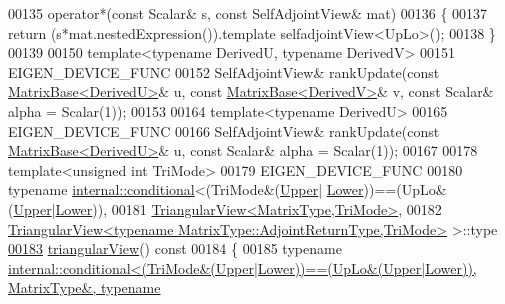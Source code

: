 \begin{DoxyCode}
00135     operator*(\textcolor{keyword}{const} Scalar& s, \textcolor{keyword}{const} SelfAdjointView& mat)
00136     \{
00137       \textcolor{keywordflow}{return} (s*mat.nestedExpression()).\textcolor{keyword}{template} selfadjointView<UpLo>();
00138     \}
00139 
00150     \textcolor{keyword}{template}<\textcolor{keyword}{typename} DerivedU, \textcolor{keyword}{typename} DerivedV>
00151     EIGEN\_DEVICE\_FUNC
00152     SelfAdjointView& rankUpdate(\textcolor{keyword}{const} \hyperlink{group___core___module_class_eigen_1_1_matrix_base}{MatrixBase<DerivedU>}& u, \textcolor{keyword}{const} 
      \hyperlink{group___core___module_class_eigen_1_1_matrix_base}{MatrixBase<DerivedV>}& v, \textcolor{keyword}{const} Scalar& alpha = Scalar(1));
00153 
00164     \textcolor{keyword}{template}<\textcolor{keyword}{typename} DerivedU>
00165     EIGEN\_DEVICE\_FUNC
00166     SelfAdjointView& rankUpdate(\textcolor{keyword}{const} \hyperlink{group___core___module_class_eigen_1_1_matrix_base}{MatrixBase<DerivedU>}& u, \textcolor{keyword}{const} Scalar& alpha = 
      Scalar(1));
00167 
00178     \textcolor{keyword}{template}<\textcolor{keywordtype}{unsigned} \textcolor{keywordtype}{int} TriMode>
00179     EIGEN\_DEVICE\_FUNC
00180     \textcolor{keyword}{typename} \hyperlink{struct_eigen_1_1internal_1_1conditional}{internal::conditional}<(TriMode&(\hyperlink{group__enums_gga39e3366ff5554d731e7dc8bb642f83cda6bcb58be3b8b8ec84859ce0c5ac0aaec}{Upper}|
      \hyperlink{group__enums_gga39e3366ff5554d731e7dc8bb642f83cda891792b8ed394f7607ab16dd716f60e6}{Lower}))==(UpLo&(\hyperlink{group__enums_gga39e3366ff5554d731e7dc8bb642f83cda6bcb58be3b8b8ec84859ce0c5ac0aaec}{Upper}|\hyperlink{group__enums_gga39e3366ff5554d731e7dc8bb642f83cda891792b8ed394f7607ab16dd716f60e6}{Lower})),
00181                                    \hyperlink{group___core___module_class_eigen_1_1_triangular_view}{TriangularView<MatrixType,TriMode>},
00182                                    
      \hyperlink{group___core___module_class_eigen_1_1_triangular_view}{TriangularView<typename MatrixType::AdjointReturnType,TriMode>}
       >::type
\hyperlink{group___core___module_ac7b8bf0e2e4636b3d1e4f0564716bf6d}{00183}     \hyperlink{group___core___module_ac7b8bf0e2e4636b3d1e4f0564716bf6d}{triangularView}()\textcolor{keyword}{ const}
00184 \textcolor{keyword}{    }\{
00185       \textcolor{keyword}{typename} 
      \hyperlink{class_eigen_1_1internal_1_1_tensor_lazy_evaluator_writable}{internal::conditional<(TriMode&(Upper|Lower))==(UpLo&(Upper|Lower)), MatrixType&, typename
}
\end{DoxyCode}
